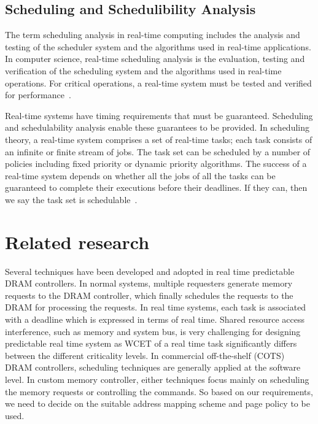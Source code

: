 \subsection{Scheduling and Schedulibility Analysis}\label{sch}
\noindent
The term scheduling analysis in real-time computing includes the analysis and testing of the scheduler system and the 
algorithms used in real-time applications. In computer science, real-time scheduling analysis is the evaluation, testing and 
verification of the scheduling system and the algorithms used in real-time operations. For critical operations, a real-time 
system must be tested and verified for performance~\cite{wiki:xxx6}. 

\noindent
Real-time systems have timing requirements that must be guaranteed. Scheduling and schedulability analysis enable these
guarantees to be provided. In scheduling theory, a real-time system comprises a set of real-time tasks; each task consists of 
an infinite or finite stream of jobs. The task set can be scheduled by a number of policies including fixed priority or 
dynamic priority algorithms. The success of a real-time system depends on whether all the jobs of all the tasks can be 
guaranteed to complete their executions before their deadlines. If they can, then we say the task set is 
schedulable~\cite{zhang2009schedulability}.




\section{Related research}\label{rel}
\noindent
Several techniques have been developed and adopted in real time predictable DRAM controllers. In normal systems, multiple 
requesters generate memory requests to the DRAM controller, which finally schedules the requests to the DRAM for processing 
the requests. In real time systems, each task is associated with a deadline which is expressed in terms of real time. Shared
resource access interference, such as memory and system bus, is very challenging for designing predictable real time system 
as WCET of a real time task significantly differs between the different criticality levels. In commercial off-the-shelf (COTS) DRAM controllers, scheduling techniques 
are generally applied at the software level. In custom memory controller, either techniques focus mainly on scheduling the 
memory requests or controlling the commands. So based on our requirements, we need to decide on the suitable address mapping 
scheme and page policy to be used.


